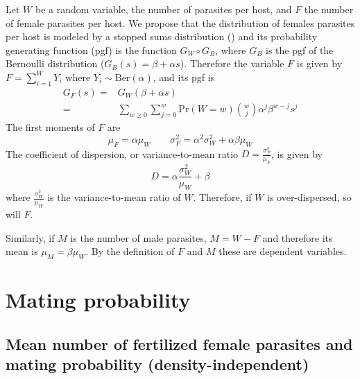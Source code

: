 \documentclass[useAMS,referee,usenatbib]{biom}
\begin{document}
Let $W$ be a random variable, the number of parasites per host, and %
$F$ the number of female parasites per host.
We propose that the distribution of females parasites per host is modeled by a stopped sums distribution (\cite{johnson2005univariate}) and its probability generating function (pgf) is the function $G_W \circ G_B$, where $G_B$  is the pgf of the Bernoulli distribution ($G_B(s)=\beta + \alpha s$)\cite{johnson2005univariate}. 
Therefore the variable $F$ is given by $F=\sum_{i=1} ^W Y_i$ where $Y_i\sim \mathrm{Ber}(\alpha)$, and its pgf is 
\begin{equation}\label{genf}
\begin{split}
G_F(s)=&G_W(\beta + \alpha s)\\
=&\sum_{w\geq 0}\sum_{j=0}^{w} \mathrm{Pr}(W=w)\binom{w}{j}\alpha^j\beta^{w-j}s^j
\end{split}
\end{equation}
The first moments of $F$ are
\begin{equation}
\mu_F=\alpha \mu_W \qquad \sigma_F^2=\alpha^2\sigma_W^2+ \alpha\beta\mu_W
\end{equation}
The coefficient of dispersion, or variance-to-mean ratio 
$D=\frac{\sigma_F^2}{\mu_F}$, is given by \[D=\alpha\frac{\sigma_W^2}{\mu_W}+\beta\]
where $\frac{\sigma_W^2}{\mu_W}$ 
is the variance-to-mean ratio of $W$.
Therefore, if $W$ is over-dispersed, so will $F$. 


Similarly, if $M$ is the number of male parasites,  $M = W - F$ and therefore its mean is $\mu_M=\beta\mu_W$. By the definition of $F$ and $M$ these are dependent variables.

\section{Mating probability}
\label{sec:probapareamiento}
\subsection{Mean number of fertilized female parasites and mating probability (density-independent)}
\end{document}
